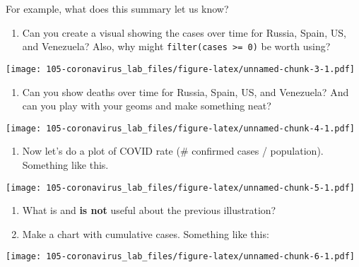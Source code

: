 \documentclass[
]{book}
\newenvironment{Shaded}{\begin{snugshade}}{\end{snugshade}}
\newcommand{\CommentTok}[1]{\textcolor[rgb]{0.56,0.35,0.01}{\textit{#1}}}
\newcommand{\FunctionTok}[1]{\textcolor[rgb]{0.00,0.00,0.00}{#1}}
\newcommand{\NormalTok}[1]{#1}
\newcommand{\SpecialCharTok}[1]{\textcolor[rgb]{0.00,0.00,0.00}{#1}}
\providecommand{\tightlist}{%
  \setlength{\itemsep}{0pt}\setlength{\parskip}{0pt}}
\begin{document}
For example, what does this summary let us know?

\begin{Shaded}
\end{Shaded}

\begin{enumerate}
\def\labelenumi{\arabic{enumi}.}
\tightlist
\item
  Can you create a visual showing the cases over time for Russia, Spain, US, and Venezuela?
  Also, why might \texttt{filter(cases\ \textgreater{}=\ 0)} be worth using?
\end{enumerate}

\texttt{[image: 105-coronavirus\_lab\_files/figure-latex/unnamed-chunk-3-1.pdf]}

\begin{enumerate}
\def\labelenumi{\arabic{enumi}.}
\setcounter{enumi}{1}
\tightlist
\item
  Can you show deaths over time for Russia, Spain, US, and Venezuela? And can you play with your geoms and make something neat?
\end{enumerate}

\texttt{[image: 105-coronavirus\_lab\_files/figure-latex/unnamed-chunk-4-1.pdf]}

\begin{enumerate}
\def\labelenumi{\arabic{enumi}.}
\setcounter{enumi}{2}
\tightlist
\item
  Now let's do a plot of COVID rate (\# confirmed cases / population). Something like this.
\end{enumerate}

\texttt{[image: 105-coronavirus\_lab\_files/figure-latex/unnamed-chunk-5-1.pdf]}

\begin{enumerate}
\def\labelenumi{\arabic{enumi}.}
\setcounter{enumi}{3}
\item
  What is and \textbf{is not} useful about the previous illustration?
\item
  Make a chart with cumulative cases. Something like this:
\end{enumerate}

\texttt{[image: 105-coronavirus\_lab\_files/figure-latex/unnamed-chunk-6-1.pdf]}
\end{document}
